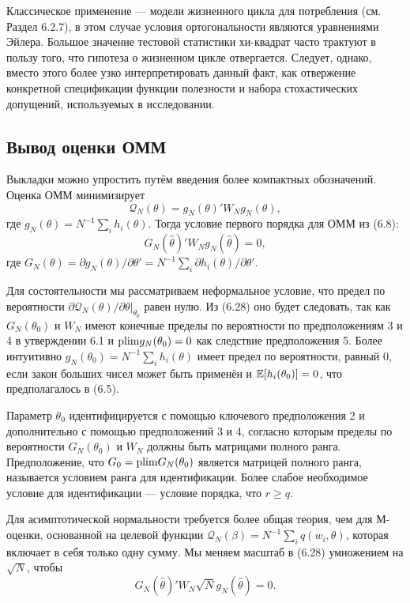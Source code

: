 Классическое применение --- модели жизненного цикла для потребления (см. Раздел 6.2.7), в этом случае условия ортогональности являются уравнениями Эйлера. Большое значение тестовой статистики хи-квадрат часто трактуют в пользу того, что гипотеза о жизненном цикле отвергается. Следует, однако, вместо этого более узко интерпретировать данный факт, как отвержение конкретной спецификации функции полезности и набора стохастических допущений, используемых в исследовании.

\subsection{Вывод оценки ОММ}

Выкладки можно упростить путём введения более компактных обозначений. Оценка ОММ минимизирует 
\begin{equation}
\mathcal{Q}_{N}(\theta)=g_N(\theta)'W_N g_N(\theta),
\end{equation}
где $g_N(\theta)=N^{-1} \sum_i h_i(\theta)$. Тогда условие первого порядка для ОММ из (6.8):
\begin{equation}
G_N(\hat{\theta})'W_N g_N(\hat{\theta})=0,
\end{equation}
где $G_N(\theta)= \partial g_N(\theta)/ \partial \theta'= N^{-1} \sum_i \partial h_i(\theta) / \partial \theta'$.

Для состоятельности мы рассматриваем неформальное условие, что предел по вероятности $\partial \mathcal{Q}_{N}(\theta) / \partial \theta|_{\theta_0}$ равен нулю. Из (6.28) оно будет следовать, так как $G_N(\theta_0)$ и $W_N$ имеют конечные пределы по вероятности по предположениям 3 и 4 в утверждении 6.1 и $\mathrm{plim } g_N(\theta_0)=0$ как следствие предположения
5. Более интуитивно $g_N(\theta_0)=N^{-1} \sum_i h_i(\theta)$ имеет предел по вероятности, равный 0, если закон больших чисел может быть применён и $\mathbb{E}[h_i(\theta_0)]=0$, что предполагалось в (6.5).

Параметр $\theta_0$ идентифицируется с помощью ключевого предположения 2 и дополнительно с помощью предположений 3 и 4, согласно которым пределы по вероятности $G_N(\theta_0)$ и $W_N$ должны быть матрицами полного ранга. Предположение, что $G_0=\mathrm{plim } G_N(\theta_0)$ является матрицей полного ранга, называется условием ранга для идентификации. Более слабое необходимое условие для идентификации --- условие порядка, что $r \ge q$.

Для асимптотической нормальности требуется более общая теория, чем для М-оценки, основанной на целевой функции $\mathcal{Q}_{N}(\beta)=N^{-1} \sum_i q(w_i,\theta)$, которая включает в себя только одну сумму. Мы меняем масштаб в (6.28) умножением на $\sqrt{N}$, чтобы
\begin{equation}
G_N(\hat{\theta})'W_N \sqrt{N} g_N(\hat{\theta})=0.
\end{equation}


